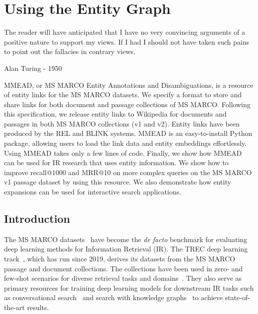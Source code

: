 \chapter{Using the Entity Graph}
\label{ch:mmead}

\epigraph{The reader will have anticipated that I have no very convincing
	arguments of a positive nature to support my views. If I had I should not
	have taken such pains to point out the fallacies in contrary views.}{Alan Turing - 1950}

\begin{Abstract}
	\begin{changemargin}{1cm}{1cm}
		MMEAD, or MS MARCO Entity Annotations and Disambiguations, is a resource of entity links for the MS MARCO datasets. We specify a format to store and share links for both document and passage collections of MS MARCO. Following this specification, we release entity links to Wikipedia for documents and passages in both MS MARCO collections (v1 and v2). Entity links have been produced by the REL and BLINK systems. 
		MMEAD is an easy-to-install Python package, allowing users to load the link data and entity embeddings effortlessly. Using MMEAD takes only a few lines of code. Finally, we show how MMEAD can be used for IR research that uses entity information. We show how to improve recall@1000 and MRR@10 on more complex queries on the MS MARCO v1 passage dataset by using this resource. We also demonstrate how entity expansions can be used for interactive search applications. 
	\end{changemargin}
\end{Abstract}

\section{Introduction} 
The MS MARCO datasets~\citep{msmarco} have become the \emph{de facto} benchmark for evaluating deep learning methods for Information Retrieval (IR). The TREC deep learning track~\citep{trec-dl}, which has run since 2019, derives its datasets from the MS MARCO passage and document collections. The collections have been used in zero- and few-shot scenarios for diverse retrieval tasks and domains~\citep{thakur2021beir, thakur2022domain, xu2022laprador}. They also serve as primary resources for training deep learning models for downstream IR tasks such as conversational search~\citep{dalton2021cast} and search with knowledge graphs~\citep{Gerritse:2022:EMBERT} to achieve state-of-the-art results.

